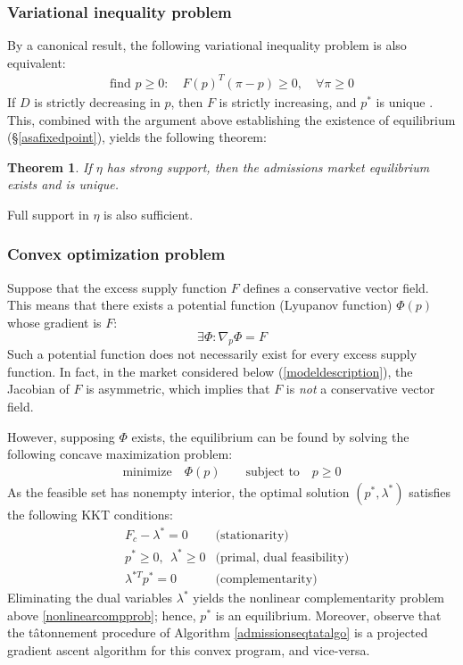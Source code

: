 \documentclass[12pt]{article}
\newtheorem{theorem}{Theorem}
\theoremstyle{definition}
\begin{document}
\subsubsection{Variational inequality problem}
By a canonical result, the following variational inequality problem is also equivalent:
\begin{align*}
\text{find } p \geq 0:\quad F(p)^T (\pi-p) \geq 0, \quad \forall \pi \geq 0
\end{align*}
If $D$ is strictly decreasing in $p$, then $F$ is strictly increasing, and $p^*$ is unique \parencite[][\S2]{theoryofvariationalinequalities}. This, combined with the argument above establishing the existence of equilibrium (\S\ref{asafixedpoint}), yields the following theorem:
\begin{theorem} \label{strongsupportimpliesunique}
If $\eta$ has strong support, then the admissions market equilibrium exists and is unique.
\end{theorem}
Full support in $\eta$ is also sufficient.

\subsubsection{Convex optimization problem}
Suppose that the excess supply function $F$ defines a conservative vector field. This means that there exists a potential function (Lyupanov function) $\Phi(p)$ whose gradient is $F$:
\[\exists \Phi: \nabla_p \Phi = F\]
Such a potential function does not necessarily exist for every excess supply function. In fact, in the market considered below (\ref{modeldescription}), the Jacobian of $F$ is asymmetric, which implies that $F$ is \emph{not} a conservative vector field. 

However, supposing $\Phi$ exists, the equilibrium can be found by solving the following concave maximization problem:
\begin{align*}
\text{minimize} \quad \Phi(p) \qquad \text{subject to} \quad  p \geq 0 
\end{align*}
As the feasible set has nonempty interior, the optimal solution $(p^*, \lambda^*)$ satisfies the following KKT conditions:
\begin{align*}
&F_c - \lambda^* = 0 & \text{(stationarity)}\\
&p^* \geq 0, ~~ \lambda^* \geq 0  & \text{(primal, dual feasibility)}\\
&\lambda^{*T} p^*=0  & \text{(complementarity)}
\end{align*}
Eliminating the dual variables $\lambda^*$ yields the nonlinear complementarity problem above \eqref{nonlinearcompprob}; hence, $p^*$ is an equilibrium. Moreover, observe that the t\^{a}tonnement procedure of Algorithm \ref{admissionseqtatalgo} is a projected gradient ascent algorithm for this convex program, and vice-versa. 
\end{document}
